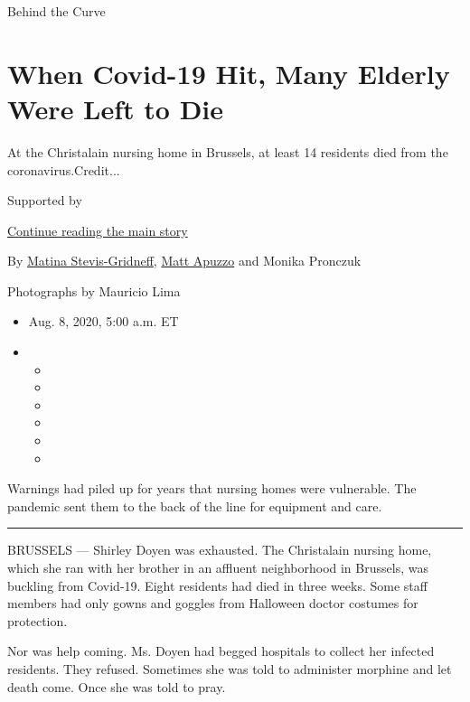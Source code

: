Behind the Curve

\hypertarget{when-covid-19-hit-many-elderly-were-left-to-die}{%
\section{When Covid-19 Hit, Many Elderly Were Left to
Die}\label{when-covid-19-hit-many-elderly-were-left-to-die}}

At the Christalain nursing home in Brussels, at least 14 residents died
from the coronavirus.Credit...

Supported by

\protect\hyperlink{after-sponsor}{Continue reading the main story}

By \href{https://www.nytimes.com/by/matina-stevis-gridneff}{Matina
Stevis-Gridneff}, \href{https://www.nytimes.com/by/matt-apuzzo}{Matt
Apuzzo} and Monika Pronczuk

Photographs by Mauricio Lima

\begin{itemize}
\item
  Aug. 8, 2020, 5:00 a.m. ET
\item
  \begin{itemize}
  \item
  \item
  \item
  \item
  \item
  \item
  \end{itemize}
\end{itemize}

Warnings had piled up for years that nursing homes were vulnerable. The
pandemic sent them to the back of the line for equipment and care.

\begin{center}\rule{0.5\linewidth}{\linethickness}\end{center}

BRUSSELS --- Shirley Doyen was exhausted. The Christalain nursing home,
which she ran with her brother in an affluent neighborhood in Brussels,
was buckling from Covid-19. Eight residents had died in three weeks.
Some staff members had only gowns and goggles from Halloween doctor
costumes for protection.

Nor was help coming. Ms. Doyen had begged hospitals to collect her
infected residents. They refused. Sometimes she was told to administer
morphine and let death come. Once she was told to pray.

